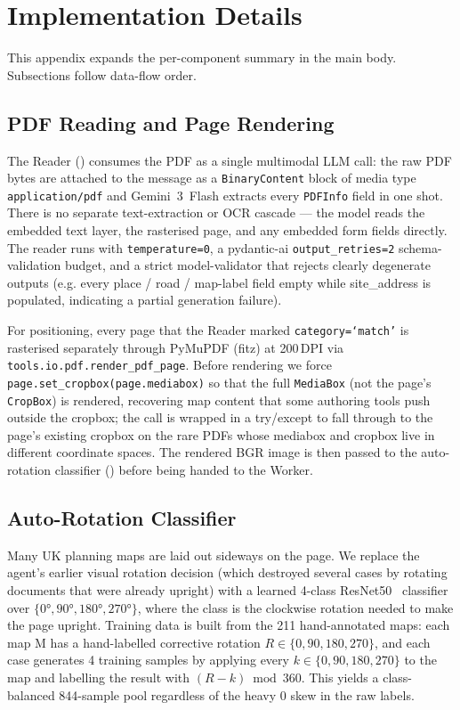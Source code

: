 \documentclass[11pt]{article}
\begin{document}
\section{Implementation Details}
\label{sec:impl-appendix}

This appendix expands the per-component summary in the main body. Subsections follow data-flow order.

\subsection{PDF Reading and Page Rendering}
\label{appendix:text-extraction}

The Reader () consumes the PDF as a single multimodal LLM call: the raw PDF bytes are attached to the message as a \texttt{BinaryContent} block of media type \texttt{application/pdf} and Gemini~3~Flash extracts every \texttt{PDFInfo} field in one shot. There is no separate text-extraction or OCR cascade --- the model reads the embedded text layer, the rasterised page, and any embedded form fields directly. The reader runs with \texttt{temperature=0}, a pydantic-ai \texttt{output\_retries=2} schema-validation budget, and a strict model-validator that rejects clearly degenerate outputs (e.g. every place / road / map-label field empty while site\_address is populated, indicating a partial generation failure).

For positioning, every page that the Reader marked \texttt{category=`match'} is rasterised separately through PyMuPDF (fitz) at 200\,DPI via \texttt{tools.io.pdf.render\_pdf\_page}. Before rendering we force \texttt{page.set\_cropbox(page.mediabox)} so that the full \texttt{MediaBox} (not the page's \texttt{CropBox}) is rendered, recovering map content that some authoring tools push outside the cropbox; the call is wrapped in a try/except to fall through to the page's existing cropbox on the rare PDFs whose mediabox and cropbox live in different coordinate spaces. The rendered BGR image is then passed to the auto-rotation classifier () before being handed to the Worker.

\subsection{Auto-Rotation Classifier}
\label{subsection:rotation-classifier}

Many UK planning maps are laid out sideways on the page. We replace the agent's earlier visual rotation decision (which destroyed several cases by rotating documents that were already upright) with a learned 4-class ResNet50~\cite{he2016resnet} classifier over $\{0°, 90°, 180°, 270°\}$, where the class is the clockwise rotation needed to make the page upright. Training data is built from the 211 hand-annotated maps: each map M has a hand-labelled corrective rotation $R \in \{0, 90, 180, 270\}$, and each case generates 4 training samples by applying every $k \in \{0, 90, 180, 270\}$ to the map and labelling the result with $(R - k) \bmod 360$. This yields a class-balanced 844-sample pool regardless of the heavy 0\textdegree{} skew in the raw labels.
\end{document}
